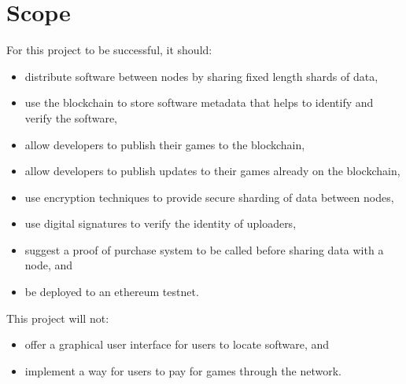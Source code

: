 \section{Scope}

For this project to be successful, it should:

\begin{itemize}
  \item distribute software between nodes by sharing fixed length shards of data,
  \item use the blockchain to store software metadata that helps to identify and verify the software,
  \item allow developers to publish their games to the blockchain,
  \item allow developers to publish updates to their games already on the blockchain,
  \item use encryption techniques to provide secure sharding of data between nodes,
  \item use digital signatures to verify the identity of uploaders,
  \item suggest a proof of purchase system to be called before sharing data with a node, and
  \item be deployed to an ethereum testnet.
\end{itemize}

\vspace{1mm}
\noindent This project will not:

\begin{itemize}
  \item offer a graphical user interface for users to locate software, and
  \item implement a way for users to pay for games through the network.
\end{itemize}